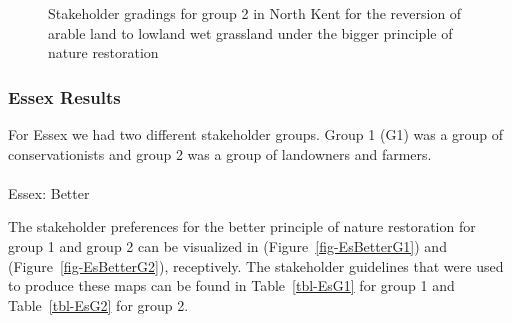 \documentclass[
  12pt,
  letterpaper,
  DIV=11,
  numbers=noendperiod]{scrartcl}
\makeatletter
\let\oldparagraph\paragraph
\renewcommand{\paragraph}{
    \@ifstar
      \xxxParagraphStar
      \xxxParagraphNoStar
  }
\newcommand{\xxxParagraphStar}[1]{\oldparagraph*{#1}\mbox{}}
\newcommand{\xxxParagraphNoStar}[1]{\oldparagraph{#1}\mbox{}}
\makeatother
\begin{document}
\begin{figure}[H]


\caption{\label{fig-NKArMoreG2}Stakeholder gradings for group 2 in North
Kent for the reversion of arable land to lowland wet grassland under the
bigger principle of nature restoration}

\end{figure}%

\newpage{}

\subsubsection{Essex Results}\label{essex-results}

For Essex we had two different stakeholder groups. Group 1 (G1) was a
group of conservationists and group 2 was a group of landowners and
farmers.

\paragraph{Essex: Better}\label{essex-better}

The stakeholder preferences for the better principle of nature
restoration for group 1 and group 2 can be visualized in
(Figure~\ref{fig-EsBetterG1}) and (Figure~\ref{fig-EsBetterG2}),
receptively. The stakeholder guidelines that were used to produce these
maps can be found in Table~\ref{tbl-EsG1} for group 1 and
Table~\ref{tbl-EsG2} for group 2.
\end{document}
